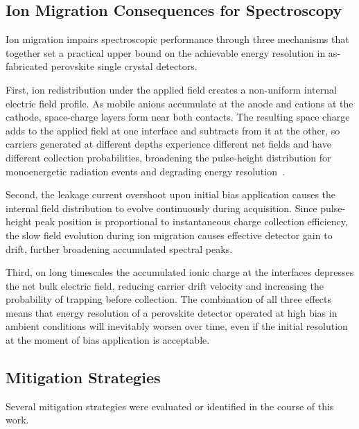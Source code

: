 \subsection{Ion Migration Consequences for Spectroscopy}
\label{sec:ion_migration_spectroscopy}

Ion migration impairs spectroscopic performance through three
mechanisms that together set a practical upper bound on the
achievable energy resolution in as-fabricated perovskite single
crystal detectors.

First, ion redistribution under the applied field creates a
non-uniform internal electric field profile.  As mobile anions
accumulate at the anode and cations at the cathode, space-charge
layers form near both contacts.  The resulting space charge adds
to the applied field at one interface and subtracts from it at
the other, so carriers generated at different depths experience
different net fields and have different collection probabilities,
broadening the pulse-height distribution for monoenergetic
radiation events and degrading energy resolution~\cite{He1997CZT}.

Second, the leakage current overshoot upon initial bias
application causes the internal field distribution to evolve
continuously during acquisition.  Since pulse-height peak
position is proportional to instantaneous charge collection
efficiency, the slow field evolution during ion migration causes
effective detector gain to drift, further broadening accumulated
spectral peaks.

Third, on long timescales the accumulated ionic charge at the
interfaces depresses the net bulk electric field, reducing
carrier drift velocity and increasing the probability of trapping
before collection.  The combination of all three effects means
that energy resolution of a perovskite detector operated at high
bias in ambient conditions will inevitably worsen over time, even
if the initial resolution at the moment of bias application is
acceptable.

\subsection{Mitigation Strategies}
\label{sec:mitigation}

Several mitigation strategies were evaluated or identified in the
course of this work.


